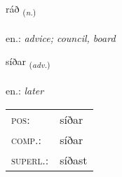 \documentclass[frontgrid, backgrid]{flacards}\usepackage[]{graphicx}\usepackage[]{xcolor}
\begin{document}
\renewcommand{\blhead}{\vskip5pt {\small\bfseries\footnotesize Nafnorð | Noun }}
\renewcommand{\bcfoot}{\vskip5pt \hspace{2pt}{\small\bfseries\footnotesize 1K}}


{ráð \small{\textsubscript{(\textit{n.})}} \\[1ex] %
\textphonetic{[rauːð]} \\
en.: \emph{advice; council, board} \\  [2ex]
\renewcommand*{\arraystretch}{0.8}
}

\renewcommand{\flhead}{\vskip5pt \fboxsep=0pt {\small\bfseries\footnotesize Atviksorð | Adverb}}
\renewcommand{\fcfoot}{\vskip5pt \fboxsep=0pt \hspace{2pt}{\small\bfseries\footnotesize 1K}}

\renewcommand{\blhead}{\vskip5pt {\small\bfseries\footnotesize Atviksorð | Adverb }}
\renewcommand{\bcfoot}{\vskip5pt \hspace{2pt}{\small\bfseries\footnotesize 1K}}


{síðar \small{\textsubscript{(\textit{adv.})}} \\[1ex] %
\textphonetic{[siːðar]} \\
en.: \emph{later} \\  [2ex]
\renewcommand*{\arraystretch}{0.8}
\begin{tabular}{ll}
\textsc{pos}: & síðar \\ 
\textsc{comp.}: & síðar \\ 
\textsc{superl.}: & síðast \\
\end{tabular}
}

\renewcommand{\flhead}{\vskip5pt \fboxsep=0pt {\small\bfseries\footnotesize Sagnorð | Verb}}
\renewcommand{\fcfoot}{\vskip5pt \fboxsep=0pt \hspace{2pt}{\small\bfseries\footnotesize 1K}}
\end{document}
